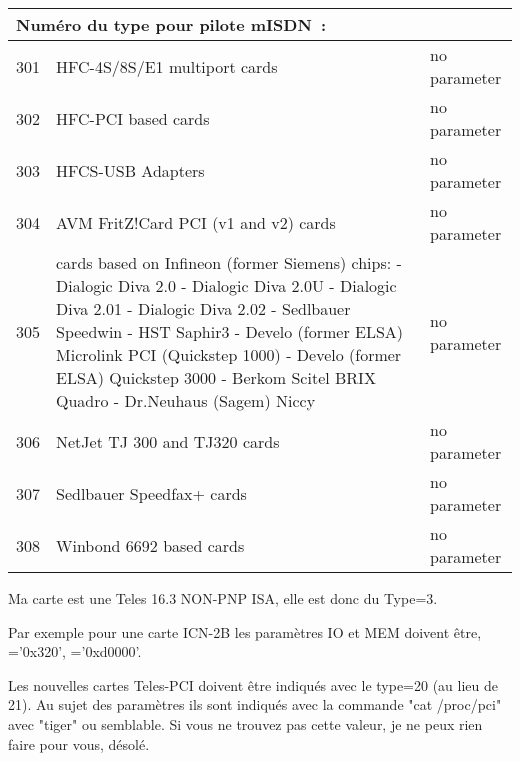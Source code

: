 \begin{description}
\begin{small}
\begin{longtable}{|r|p{60mm}|p{62mm}|}
    \hline\hline
    \multicolumn{3}{|l|}{Numéro du type pour pilote mISDN~:} \\
    \hline

    301 & HFC-4S/8S/E1 multiport cards         & no parameter \\
    302 & HFC-PCI based cards                  & no parameter \\
    303 & HFCS-USB Adapters                    & no parameter \\
    304 & AVM FritZ!Card PCI (v1 and v2) cards & no parameter \\
    305 & cards based on Infineon (former Siemens) chips: \newline
          - Dialogic Diva 2.0 \newline
          - Dialogic Diva 2.0U \newline
          - Dialogic Diva 2.01 \newline
          - Dialogic Diva 2.02 \newline
          - Sedlbauer Speedwin \newline
          - HST Saphir3 \newline
          - Develo (former ELSA) Microlink PCI (Quickstep 1000) \newline
          - Develo (former ELSA) Quickstep 3000 \newline
          - Berkom Scitel BRIX Quadro \newline
          - Dr.Neuhaus (Sagem) Niccy           & no parameter \\
    306 & NetJet TJ 300 and TJ320 cards        & no parameter \\
    307 & Sedlbauer Speedfax+ cards            & no parameter \\
    308 & Winbond 6692 based cards             & no parameter \\
    \hline
  \end{longtable}
\end{small}

  Ma carte est une Teles 16.3 NON-PNP ISA, elle est donc du Type=3.

  Par exemple pour une carte ICN-2B les paramètres IO et MEM doivent être,
  ='0x320', ='0xd0000'.

  Les nouvelles cartes Teles-PCI doivent être indiqués avec le type=20 (au lieu de 21).
  Au sujet des paramètres ils sont indiqués avec la commande "cat /proc/pci" avec "tiger"
  ou semblable. Si vous ne trouvez pas cette valeur, je ne peux rien faire pour vous, désolé.


\end{description}

